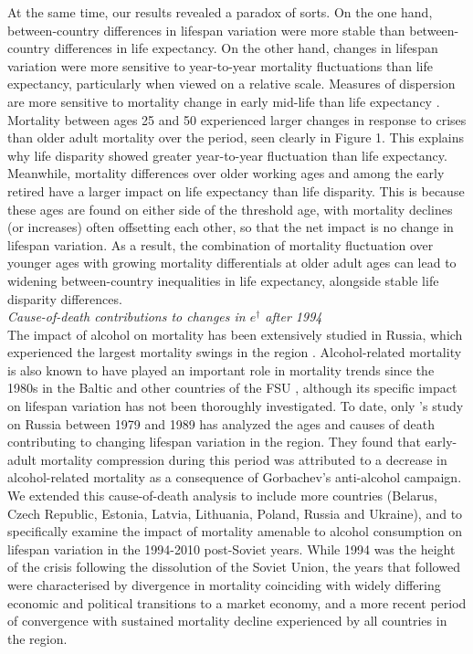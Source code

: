 \documentclass{article}
\begin{document}
\begin{spacing}{1.5}
At the same time, our results revealed a paradox of sorts. On the one hand, between-country differences in lifespan variation were more stable than between-country differences in life expectancy. On the other hand, changes in lifespan variation were more sensitive to year-to-year mortality fluctuations than life expectancy, \textcolor[rgb]{1,0,0}{particularly when viewed on a relative scale}. Measures of dispersion are more sensitive to mortality change in early mid-life than life expectancy \citep{vanraalte2013}. Mortality between ages 25 and 50 \textcolor[rgb]{1,0,0}{experienced larger changes in response to crises} than older adult mortality over the period, seen clearly in Figure 1. This explains why life disparity showed greater year-to-year fluctuation than life expectancy. Meanwhile, mortality differences over older working ages and among the early retired have a larger impact on life expectancy than life disparity. This is because these ages are found on either side of the threshold age, with mortality declines (or increases) often offsetting each other, so that the net impact is no change in lifespan variation. As a result, the combination of mortality fluctuation over younger ages with growing mortality differentials at older adult ages can lead to widening between-country inequalities in life expectancy, alongside stable life disparity differences.
\\

\emph{Cause-of-death contributions to changes in $e^\dagger$ after 1994}\\

The impact of alcohol on mortality has been extensively studied in Russia, which experienced the largest mortality swings in the region \citep{leon1997huge,rehm2007, shkolnikov2013components,shkolnikov2001}. Alcohol-related mortality is also known to have played an important role in mortality trends since the 1980s in the Baltic and other countries of the FSU \citep{rehm2007,jasilionis2011}, 
although its specific impact on lifespan variation has not been thoroughly investigated. To date, only \citet{shkolnikov2003}'s study on Russia between 1979 and 1989 has analyzed the ages and causes of death contributing to changing lifespan variation in the region. They found that early-adult mortality compression during this period was attributed to a decrease in alcohol-related mortality as a consequence of Gorbachev's anti-alcohol campaign. We extended this cause-of-death analysis to include more countries (Belarus, Czech Republic, Estonia, Latvia, Lithuania, Poland, Russia and Ukraine), and to specifically examine the impact of mortality amenable to alcohol consumption on lifespan variation in the 1994-2010 post-Soviet years. While 1994 was the height of the crisis following the dissolution of the Soviet Union, the years that followed were characterised by divergence in mortality coinciding with widely differing economic and political transitions to a market economy, and a more recent period of convergence with sustained mortality decline experienced by all countries in the region.\\


\end{spacing}
\end{document}
